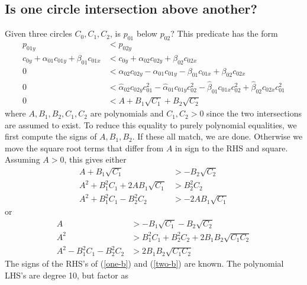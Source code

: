 \documentclass[11pt]{article}
\newcommand{\halpha}{\hat{\alpha}}
\newcommand{\hbeta}{\hat{\beta}}
\begin{document}
\subsection{Is one circle intersection above another?}

Given three circles $C_0,C_1,C_2$, is $p_{01}$ below $p_{02}$?  This predicate has the form
\begin{align*}
p_{01y} &< p_{02y} \\
c_{0y} + \alpha_{01} c_{01y} + \beta_{01} c_{01x} &< c_{0y} + \alpha_{02} c_{02y} + \beta_{02} c_{02x} \\
0 &< \alpha_{02} c_{02y} - \alpha_{01} c_{01y} - \beta_{01} c_{01x} + \beta_{02} c_{02x} \\
0 &< \halpha_{02} c_{02y} c_{01}^2 - \halpha_{01} c_{01y} c_{02}^2 - \hbeta_{01} c_{01x} c_{02}^2+ \hbeta_{02} c_{02x} c_{01}^2 \\
0 &< A + B_1 \sqrt{C_1} + B_2 \sqrt{C_2}
\end{align*}
where $A,B_1,B_2,C_1,C_2$ are polynomials and $C_1, C_2 > 0$ since the two intersections are assumed to exist.  To reduce this equality to
purely polynomial equalities, we first compute the signs of $A, B_1, B_2$.  If these all match, we are done.  Otherwise we move the square root
terms that differ from $A$ in sign to the RHS and square.  Assuming $A > 0$, this gives either
\begin{align}
A + B_1 \sqrt{C_1} &> -B_2 \sqrt{C_2} \nonumber \\
A^2 + B_1^2 C_1 + 2 A B_1 \sqrt{C_1} &> B_2^2 C_2 \nonumber \\
A^2 + B_1^2 C_1 - B_2^2 C_2 &> -2 A B_1 \sqrt{C_1} \label{one-b}
\end{align}
or
\begin{align}
A &> -B_1 \sqrt{C_1} - B_2 \sqrt{C_2} \nonumber \\
A^2 &> B_1^2 C_1 + B_2^2 C_2 + 2 B_1 B_2 \sqrt{C_1 C_2} \nonumber \\
A^2 - B_1^2 C_1 - B_2^2 C_2 &> 2 B_1 B_2 \sqrt{C_1 C_2} \label{two-b}
\end{align}
The signs of the RHS's of (\ref{one-b}) and (\ref{two-b}) are known.  The polynomial LHS's are degree 10, but factor as
\end{document}
